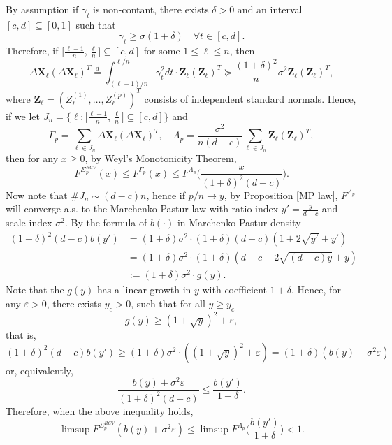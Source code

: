 \documentclass[a4paper,11pt]{article}
\theoremstyle{plain}
\theoremstyle{definition}
\renewenvironment{proof}{{\scshape Proof:}}{}
\begin{document}
    \begin{proof}
    	By assumption if $\gamma_t$ is non-contant, there exists $\delta > 0$ and an interval $[c, d] \subseteq [0, 1] $ such that
    	\[ \gamma_t \geq \sigma(1+\delta) \quad \forall t \in [c, d]. \]
    	Therefore, if $\big[ \frac{\ell - 1}{n}, \frac{\ell}{n} \big] \subseteq [c, d] $ for some $1 \leq \ell \leq n$, then
    	\[ \Delta \mathbf{X}_\ell (\Delta \mathbf{X}_\ell )^T \stackrel{d}{=} \int_{(\ell-1)/n}^{\ell/n} \gamma_t^2 dt \cdot \mathbf{Z}_\ell(\mathbf{Z}_\ell)^T \succeq \frac{(1+\delta)^2}{n} \sigma^2 \mathbf{Z}_\ell(\mathbf{Z}_\ell)^T,  \]
    	where $\mathbf{Z}_\ell = (Z_\ell^{(1)}, \dots , Z_\ell^{(p)})^T$ consists of independent standard normals. Hence, if we let $ J_n = \big\{ \ell: \big[ \frac{\ell - 1}{n}, \frac{\ell}{n} \big] \subseteq [c, d] \big\} $ and
    	\[ \Gamma_p = \sum_{\ell \in J_n} \Delta \mathbf{X}_\ell (\Delta \mathbf{X}_\ell )^T, \quad \Lambda_p = \frac{\sigma^2}{n(d-c)} \sum_{\ell \in J_n} \mathbf{Z}_\ell (\mathbf{Z}_\ell )^T,  \]
    	then for any $x \geq 0$, by Weyl's Monotonicity Theorem,
    	\[
    	F^{\Sigma_p^{RCV}}(x) \leq F^{\Gamma_p}(x) \leq F^{\Lambda_p}\bigg(\frac{x}{(1+\delta)^2(d-c)}\bigg).
    	\]
	    Now note that $\# J_n \sim (d-c)n$, hence if $p/n \rightarrow y$, by Proposition \ref{MP law}, $F^{\Lambda_p}$ will converge a.s. to the Marchenko-Pastur law with ratio index $y'=\frac{y}{d-c}$ and scale index $\sigma^2$.
	    By the formula of $b(\cdot)$ in Marchenko-Pastur density
	    \[
	    \begin{aligned}
	    (1+\delta)^2(d-c)b(y') &=(1+\delta)\sigma^2 \cdot (1+\delta)(d-c)(1+2\sqrt{y'}+y') \\
	    & =(1+\delta)\sigma^2 \cdot (1+\delta)(d-c + 2\sqrt{(d-c)y} + y) \\
	    & := (1+\delta)\sigma^2 \cdot  g(y).
	    \end{aligned}
	    \]
	    Note that the $g(y)$ has a linear growth in $y$ with coefficient $1+\delta$. Hence, for any $\varepsilon > 0$, there exists $y_c > 0$, such that for all $y \geq y_c$
	    \[ g(y) \geq (1+\sqrt{y})^2+\varepsilon,  \]
	    that is,
	    \[ (1+\delta)^2(d-c)b(y') \geq (1+\delta) \sigma^2 \cdot ((1+\sqrt{y})^2+\varepsilon) = (1+\delta)(b(y)+\sigma^2\varepsilon)  \]
	    or, equivalently,
	    \[ \frac{b(y) + \sigma^2\varepsilon}{(1+\delta)^2(d-c)} \leq \frac{b(y')}{1+\delta}. \]
	    Therefore, when the above inequality holds,
	    \[\limsup F^{\Sigma_p^{RCV}}(b(y) + \sigma^2\varepsilon) \leq \limsup F^{\Lambda_p}\bigg(\frac{b(y')}{1+\delta}\bigg) < 1. \]
    \end{proof}
    
\end{document}
